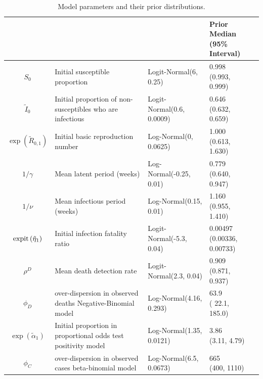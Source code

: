 \begin{table}
	\caption[Parameters and priors.]{Model parameters and their prior distributions.}
	\label{ch_4:table:priors}
	\scriptsize\centering
	\begin{tabularx}{\columnwidth}{cXllc}
	\thead{Parameter} & \thead{Interpretation} & \thead{Prior} & \thead{Prior Median\\ (95\% Interval)} & \thead{Source} \\ \hline
$S_0$ & Initial susceptible proportion & Logit-Normal(6, 0.25) & \makecell{0.998 \\ (0.993, 0.999)} & \\
$\tilde{I}_{0}$ & Initial proportion of non-susceptibles who are infectious & Logit-Normal(0.6, 0.0009) & \makecell{0.646 \\ (0.632, 0.659)} & \\
$\exp\left(\tilde{R}_{0,1}\right)$ & Initial basic reproduction number & Log-Normal(0, 0.0625) & \makecell{1.000 \\ (0.613, 1.630)} & \\
$1 / \gamma$ & Mean latent period (weeks) & Log-Normal(-0.25, 0.01) & \makecell{0.779 \\ (0.640, 0.947)} & \cite{Xin2021} \\
$1 / \nu$ & Mean infectious period (weeks) & Log-Normal(0.15, 0.01) & \makecell{1.160 \\ (0.955, 1.410)} & \cite{Byrnee039856} \\
$\operatorname{expit}\left(\tilde{\eta}_1\right)$ & Initial infection fatality ratio & Logit-Normal(-5.3, 0.04) & \makecell{0.00497 \\ (0.00336, 0.00733)} & \cite{Bruckner2021} \\
$\rho^D$ & Mean death detection rate & Logit-Normal(2.3, 0.04) & \makecell{0.909 \\ (0.871, 0.937)} & \cite{Bruckner2021} \\
$\phi_D$ & over-dispersion in observed deaths Negative-Binomial model & Log-Normal(4.16, 0.293) & \makecell{ 63.9 \\ ( 22.1, 185.0)} & \\
$\exp\left(\tilde{\alpha}_1\right)$ & Initial proportion in proportional odds test positivity model & Log-Normal(1.35, 0.0121) & \makecell{3.86 \\ (3.11, 4.79)} & \\
$\phi_C$ & over-dispersion in observed cases beta-binomial model & Log-Normal(6.5, 0.0673) & \makecell{ 665 \\ (400, 1110)} & \\

\end{tabularx}
\end{table}
